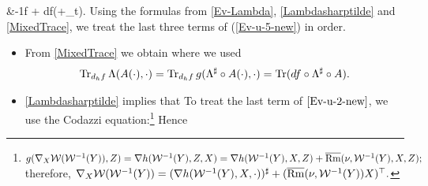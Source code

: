 {{    &-\fr 1f + df(+\del_{t}).}
Using the formulas from \cref{Ev-Lambda}, \cref{Lambdasharptilde} and \cref{MixedTrace}, we treat the last three terms of (\ref{Ev-u-5-new}) in order.
\begin{itemize}
  \item From \cref{MixedTrace} we obtain
where we used
\begin{align}
\operatorname{Tr}_{d_{h}f}\Lambda(A(\cdot),\cdot)=\operatorname{Tr}_{d_hf}g(\Lambda^{\sharp}\circ A(\cdot),\cdot)=\operatorname{Tr} (df\circ\Lambda^{\sharp}\circ A).
\end{align}
  \item \cref{Lambdasharptilde} implies that
To treat the last term of $\eqref{Ev-u-2-new}$, we use the Codazzi equation:\footnote{$g(\nabla_X \mathcal{W}(\mathcal{W}^{-1}(Y)),Z)=\nabla h(\mathcal{W}^{-1}(Y),Z,X)=\nabla h(\mathcal{W}^{-1}(Y),X,Z)+\overline{\mathrm{Rm}}(\nu,\mathcal{W}^{-1}(Y),X,Z);$ therefore,
$\nabla_X \mathcal{W}(\mathcal{W}^{-1}(Y))=(\nabla h(\mathcal{W}^{-1}(Y),X,\cdot))^{\sharp}+(\overline{\mathrm{Rm}}(\nu,\mathcal{W}^{-1}(Y))X)^{\top}.$}
Hence
\end{itemize}}
